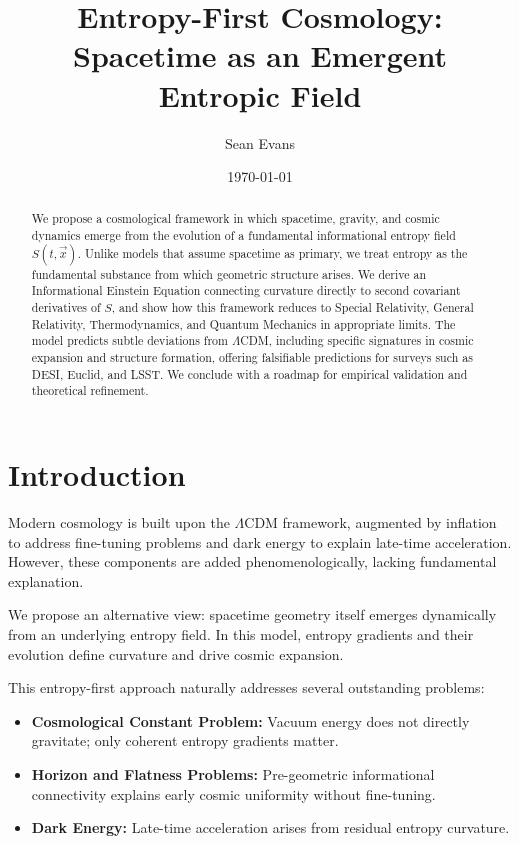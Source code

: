 \documentclass{article}
\title{Entropy-First Cosmology: Spacetime as an Emergent Entropic Field}
\author{Sean Evans}
\date{\today}
\begin{document}
\maketitle

\begin{abstract}
We propose a cosmological framework in which spacetime, gravity, and cosmic dynamics emerge from the evolution of a fundamental informational entropy field $S(t, \vec{x})$.
Unlike models that assume spacetime as primary, we treat entropy as the fundamental substance from which geometric structure arises.
We derive an Informational Einstein Equation connecting curvature directly to second covariant derivatives of $S$, and show how this framework reduces to Special Relativity, General Relativity, Thermodynamics, and Quantum Mechanics in appropriate limits.
The model predicts subtle deviations from $\Lambda$CDM, including specific signatures in cosmic expansion and structure formation, offering falsifiable predictions for surveys such as DESI, Euclid, and LSST.
We conclude with a roadmap for empirical validation and theoretical refinement.
\end{abstract}

\section{Introduction}

Modern cosmology is built upon the $\Lambda$CDM framework, augmented by inflation to address fine-tuning problems and dark energy to explain late-time acceleration.
However, these components are added phenomenologically, lacking fundamental explanation.

We propose an alternative view: spacetime geometry itself emerges dynamically from an underlying entropy field.
In this model, entropy gradients and their evolution define curvature and drive cosmic expansion.

This entropy-first approach naturally addresses several outstanding problems:
\begin{itemize}
    \item \textbf{Cosmological Constant Problem:} Vacuum energy does not directly gravitate; only coherent entropy gradients matter.
    \item \textbf{Horizon and Flatness Problems:} Pre-geometric informational connectivity explains early cosmic uniformity without fine-tuning.
    \item \textbf{Dark Energy:} Late-time acceleration arises from residual entropy curvature.
\end{itemize}
\end{document}

